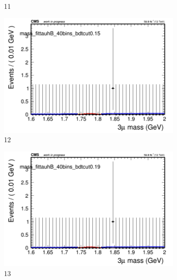 \begin{figure}[h!]
\begin{subfigure}{0.2\textwidth}
        \caption{11}
    \end{subfigure}
    \begin{subfigure}{0.2\textwidth}
        \includegraphics[width=\textwidth]{power_law/plots/tauhB/massfit_tauhB_40bins_bdtcut0.15.png}
        \caption{12}
    \end{subfigure}
    \begin{subfigure}{0.2\textwidth}
        \includegraphics[width=\textwidth]{power_law/plots/tauhB/massfit_tauhB_40bins_bdtcut0.19.png}
        \caption{13}
    \end{subfigure}
    \begin{subfigure}{0.2\textwidth}

\end{subfigure}
\end{figure}
